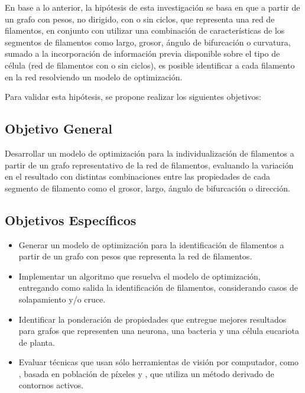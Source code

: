 En base a lo anterior, la hip\'otesis de esta investigaci\'on se basa en que a partir de un grafo con pesos, no dirigido, con o sin ciclos, que representa una red de filamentos, en conjunto con utilizar una combinaci\'on de caracter\'isticas de los segmentos de filamentos como largo, grosor, \'angulo de bifurcaci\'on o curvatura, sumado a la incorporaci\'on de informaci\'on previa disponible sobre el tipo de c\'elula (red de filamentos con o sin ciclos), es posible identificar a cada filamento en la red resolviendo un modelo de optimizaci\'on.

Para validar esta hip\'otesis, se propone realizar los siguientes objetivos:
\subsection{Objetivo General}
Desarrollar un modelo de optimizaci\'on para la individualizaci\'on de filamentos a partir de un grafo representativo de la red de filamentos, evaluando la variaci\'on en el resultado con distintas combinaciones entre las propiedades de cada segmento de filamento como el grosor, largo, \'angulo de bifurcaci\'on o direcci\'on.

\subsection{Objetivos Espec\'ificos}
\begin{itemize}
    \item Generar un modelo de optimizaci\'on para la identificaci\'on de filamentos a partir de un grafo con pesos que representa la red de filamentos.
    \item Implementar un algoritmo que resuelva el modelo de optimizaci\'on, entregando como salida la identificaci\'on de filamentos, considerando casos de solapamiento y/o cruce.
    \item Identificar la ponderaci\'on de propiedades que entregue mejores resultados para grafos que representen una neurona, una bacteria y una c\'elula eucariota de planta.
    \item Evaluar t\'ecnicas que usan s\'olo herramientas de visi\'on por computador, como \cite{boudaoud2014fibriltool}, basada en poblaci\'on de p\'ixeles y \cite{xu2015soax}, que utiliza un m\'etodo derivado de contornos activos. 
    
\end{itemize}

